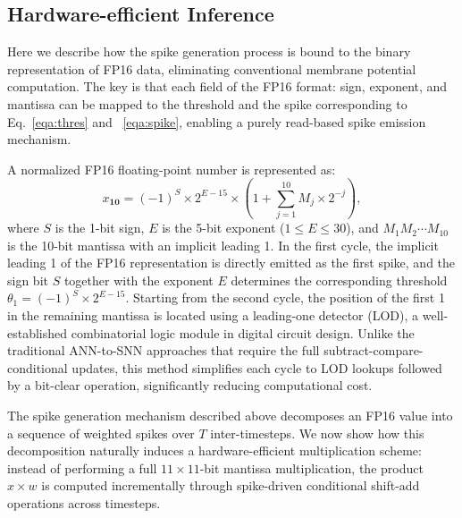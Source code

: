 \subsection{Hardware-efficient Inference}
\label{sec:hw}

Here we describe how the spike generation process is  bound to the binary representation of FP16 data, eliminating conventional membrane potential computation. The key is that each field of the FP16 format: sign, exponent, and mantissa can be mapped to the threshold and the spike corresponding to Eq.~\eqref{eqa:thres} and ~\eqref{eqa:spike}, enabling a purely read-based spike emission mechanism.

A normalized FP16 floating-point number is represented as:
\begin{equation}
    x_{\textbf{10}} = (-1)^{S} \times 2^{E-15} \times \left(1 + \sum_{j=1}^{10} M_j \times 2^{-j}\right),
\end{equation}
where $S$ is the 1-bit sign, $E$ is the 5-bit exponent ($1 \leq E \leq 30$), and $M_1 M_2 \cdots M_{10}$ is the 10-bit mantissa with an implicit leading 1. 
In the first cycle, the implicit leading 1 of the FP16 representation is directly emitted as the first spike, and the sign bit $S$ together with the exponent $E$ determines the corresponding threshold $\theta_1 = (-1)^{S} \times 2^{E-15}$. Starting from the second cycle, the position of the first 1 in the remaining mantissa is located using a leading-one detector (LOD), a well-established combinatorial logic module in digital circuit design. Unlike the traditional ANN-to-SNN approaches that require the full subtract-compare-conditional updates, this method simplifies each cycle to LOD lookups followed by a bit-clear operation, significantly reducing computational cost. 

The spike generation mechanism described above decomposes an FP16 value into a sequence of weighted spikes over $T$ inter-timesteps. We now show how this decomposition naturally induces a hardware-efficient multiplication scheme: instead of performing a full $11 \times 11$-bit mantissa multiplication, the product $x \times w$ is computed incrementally through spike-driven conditional shift-add operations across timesteps.  


